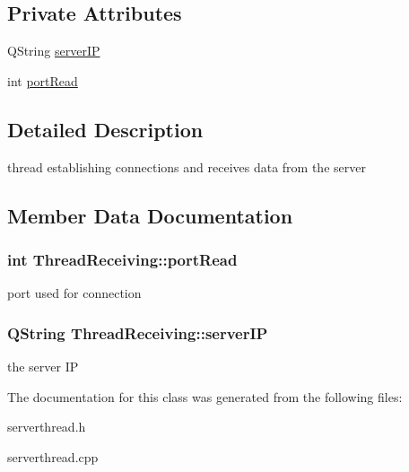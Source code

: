 \subsection*{Private Attributes}
\begin{DoxyCompactItemize}
\item 
Q\-String \hyperlink{class_thread_receiving_a8f4461638c9b0441e58b72ab427306ef}{server\-I\-P}
\item 
int \hyperlink{class_thread_receiving_ae76ea6b3c01277dad2ffa27d8a3feae4}{port\-Read}
\end{DoxyCompactItemize}


\subsection{Detailed Description}
thread establishing connections and receives data from the server 

\subsection{Member Data Documentation}
\hypertarget{class_thread_receiving_ae76ea6b3c01277dad2ffa27d8a3feae4}{
\subsubsection[{port\-Read}]{\setlength{\rightskip}{0pt plus 5cm}int Thread\-Receiving\-::port\-Read\hspace{0.3cm}{\ttfamily [private]}}}\label{class_thread_receiving_ae76ea6b3c01277dad2ffa27d8a3feae4}
port used for connection \hypertarget{class_thread_receiving_a8f4461638c9b0441e58b72ab427306ef}{
\subsubsection[{server\-I\-P}]{\setlength{\rightskip}{0pt plus 5cm}Q\-String Thread\-Receiving\-::server\-I\-P\hspace{0.3cm}{\ttfamily [private]}}}\label{class_thread_receiving_a8f4461638c9b0441e58b72ab427306ef}
the server I\-P 

The documentation for this class was generated from the following files\-:\begin{DoxyCompactItemize}
\item 
serverthread.\-h\item 
serverthread.\-cpp\end{DoxyCompactItemize}
